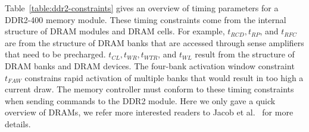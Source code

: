 Table~\ref{table:ddr2-constraints} gives an overview of timing parameters for a DDR2-400 memory module.
These timing constraints come from the internal structure of DRAM modules and DRAM cells.
For example, $t_{RCD}, t_{RP}$, and $t_{RFC}$ are from the structure of DRAM banks that are accessed through sense amplifiers that need to be precharged.
$t_{CL}, t_{WR}, t_{WTR}$, and $t_{WL}$ result from the structure of DRAM banks and DRAM devices.
The four-bank activation window constraint $t_{FAW}$ constrains rapid activation of multiple banks that would result in too high a current draw.
The memory controller must conform to these timing constraints when sending commands to the DDR2 module.  
Here we only gave a quick overview of DRAMs, we refer more interested readers to Jacob et al.~\cite{JaNgWa07} for more details.

